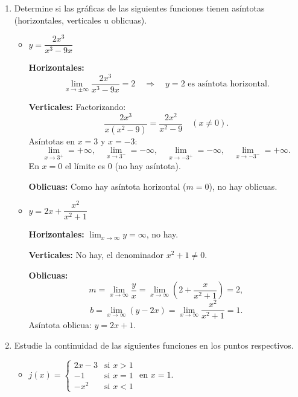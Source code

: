 \documentclass[12pt]{article}
\begin{document}
\begin{enumerate}[label=\arabic*.]
\begin{itemize}
        \item[(b)] $\displaystyle \lim_{x\to\infty}\left(\frac{5x^2+3x+4}{6x^2-5x+8}+3\right)$
        \[
        \lim_{x\to\infty} \frac{5x^2+3x+4}{6x^2-5x+8} = \frac{5}{6}, \quad \text{luego} \quad \frac{5}{6} + 3 = \frac{23}{6}.
        \]
    \end{itemize}

    \item Determine si las gráficas de las siguientes funciones tienen asíntotas (horizontales, verticales u oblicuas).
    \begin{itemize}
        \item[(a)] $y = \dfrac{2x^3}{x^3-9x}$
        
        \textbf{Horizontales:}
        \[
        \lim_{x\to\pm\infty} \frac{2x^3}{x^3-9x} = 2 \quad \Rightarrow \quad y=2 \text{ es asíntota horizontal}.
        \]
        
        \textbf{Verticales:} Factorizando:
        \[
        \frac{2x^3}{x(x^2-9)} = \frac{2x^2}{x^2-9} \quad (x\neq0).
        \]
        Asíntotas en $x=3$ y $x=-3$:
        \[
        \lim_{x\to3^+} = +\infty,\quad \lim_{x\to3^-} = -\infty, \quad \lim_{x\to-3^+} = -\infty,\quad \lim_{x\to-3^-} = +\infty.
        \]
        En $x=0$ el límite es $0$ (no hay asíntota).
        
        \textbf{Oblicuas:} Como hay asíntota horizontal ($m=0$), no hay oblicuas.
        
        \item[(b)] $y = 2x + \dfrac{x^2}{x^2+1}$
        
        \textbf{Horizontales:} $\lim_{x\to\infty} y = \infty$, no hay.
        
        \textbf{Verticales:} No hay, el denominador $x^2+1\neq0$.
        
        \textbf{Oblicuas:}
        \[
        m = \lim_{x\to\infty} \frac{y}{x} = \lim_{x\to\infty} \left(2 + \frac{x}{x^2+1}\right) = 2,
        \]
        \[
        b = \lim_{x\to\infty} (y - 2x) = \lim_{x\to\infty} \frac{x^2}{x^2+1} = 1.
        \]
        Asíntota oblicua: $y = 2x+1$.
    \end{itemize}

    \item Estudie la continuidad de las siguientes funciones en los puntos respectivos.
    \begin{itemize}
        \item[(a)] $j(x) = \begin{cases}
            2x-3 & \text{si } x>1 \\
            -1 & \text{si } x=1 \\
            -x^2 & \text{si } x<1
        \end{cases}$ en $x=1$.
        

\end{itemize}
\end{enumerate}
\end{document}
